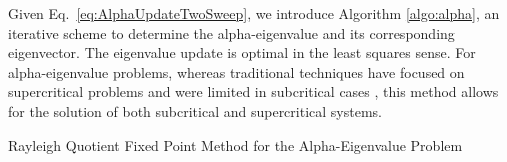 Given Eq.~\ref{eq:AlphaUpdateTwoSweep}, we introduce Algorithm \ref{algo:alpha}, an iterative scheme to determine the alpha-eigenvalue and its corresponding eigenvector. The eigenvalue update is optimal in the least squares sense. For alpha-eigenvalue problems, whereas traditional techniques have focused on supercritical problems and were limited in subcritical cases \cite{hill_efficient_1983}, this method allows for the solution of both subcritical and supercritical systems.
\begin{algorithm}[t]
	\caption{Rayleigh Quotient Fixed Point Method for the Alpha-Eigenvalue Problem}
	\label{algo:alpha}
	\begin{algorithmic}
		\ENDWHILE
	\end{algorithmic}
\end{algorithm}

